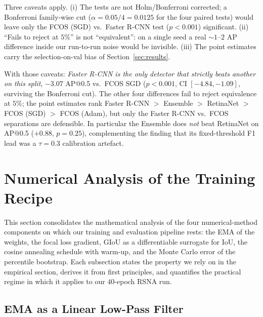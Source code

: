\documentclass[11pt,a4paper]{article}
\begin{document}
Three caveats apply. (i) The tests are not Holm/Bonferroni corrected; a Bonferroni family-wise cut ($\alpha = 0.05/4 = 0.0125$ for the four paired tests) would leave only the FCOS (SGD) vs.\ Faster R-CNN test ($p < 0.001$) significant. (ii) ``Fails to reject at $5\%$'' is not ``equivalent'': on a single seed a real $\sim 1$--$2$ AP difference inside our run-to-run noise would be invisible. (iii) The point estimates carry the selection-on-val bias of Section~\ref{sec:results}.

With those caveats: \emph{Faster R-CNN is the only detector that strictly beats another on this split}, $-3.07$ AP@0.5 vs.\ FCOS SGD ($p < 0.001$, CI $[-4.84, -1.09]$, surviving the Bonferroni cut). The other four differences fail to reject equivalence at $5\%$; the point estimates rank Faster R-CNN $>$ Ensemble $>$ RetinaNet $>$ FCOS (SGD) $>$ FCOS (Adam), but only the Faster R-CNN vs.\ FCOS separations are defensible. In particular the Ensemble does \emph{not} beat RetinaNet on AP@0.5 ($+0.88$, $p = 0.25$), complementing the finding that its fixed-threshold F1 lead was a $\tau=0.3$ calibration artefact.




\section{Numerical Analysis of the Training Recipe}
\label{sec:numerical-analysis}

This section consolidates the mathematical analysis of the four numerical-method components on which our training and evaluation pipeline rests: the EMA of the weights, the focal loss gradient, GIoU as a differentiable surrogate for IoU, the cosine annealing schedule with warm-up, and the Monte Carlo error of the percentile bootstrap. Each subsection states the property we rely on in the empirical section, derives it from first principles, and quantifies the practical regime in which it applies to our $40$-epoch RSNA run.

\subsection{EMA as a Linear Low-Pass Filter}
\label{sec:numerical-ema}
\end{document}
